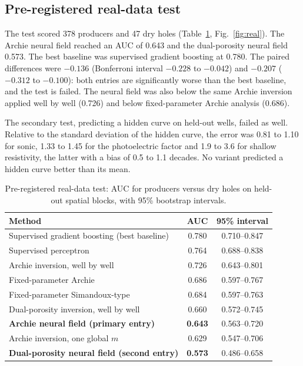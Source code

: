 \documentclass[preprint,12pt]{elsarticle}
\begin{document}
\subsection{Pre-registered real-data test}
The test scored 378 producers and 47 dry holes (Table~\ref{tab:real}, Fig.~\ref{fig:real}). The
Archie neural field reached an AUC of 0.643 and the dual-porosity neural field 0.573. The best
baseline was supervised gradient boosting at 0.780. The paired differences were $-0.136$
(Bonferroni interval $-0.228$ to $-0.042$) and $-0.207$ ($-0.312$ to $-0.100$): both entries
are significantly worse than the best baseline, and the test is failed. The neural field was
also below the same Archie inversion applied well by well (0.726) and below fixed-parameter
Archie analysis (0.686).

The secondary test, predicting a hidden curve on held-out wells, failed as well. Relative to the
standard deviation of the hidden curve, the error was 0.81 to 1.10 for sonic, 1.33 to 1.45 for
the photoelectric factor and 1.9 to 3.6 for shallow resistivity, the latter with a bias of 0.5
to 1.1 decades. No variant predicted a hidden curve better than its mean.

\begin{table}
\centering
\caption{Pre-registered real-data test: AUC for producers versus dry holes on held-out spatial
blocks, with 95\% bootstrap intervals.}
\label{tab:real}
\begin{tabular}{lcc}
\toprule
Method & AUC & 95\% interval \\
\midrule
Supervised gradient boosting (best baseline) & 0.780 & 0.710--0.847 \\
Supervised perceptron & 0.764 & 0.688--0.838 \\
Archie inversion, well by well & 0.726 & 0.643--0.801 \\
Fixed-parameter Archie & 0.686 & 0.597--0.767 \\
Fixed-parameter Simandoux-type & 0.684 & 0.597--0.763 \\
Dual-porosity inversion, well by well & 0.660 & 0.572--0.745 \\
\textbf{Archie neural field (primary entry)} & \textbf{0.643} & 0.563--0.720 \\
Archie inversion, one global $m$ & 0.629 & 0.547--0.706 \\
\textbf{Dual-porosity neural field (second entry)} & \textbf{0.573} & 0.486--0.658 \\
\bottomrule
\end{tabular}
\end{table}
\end{document}
